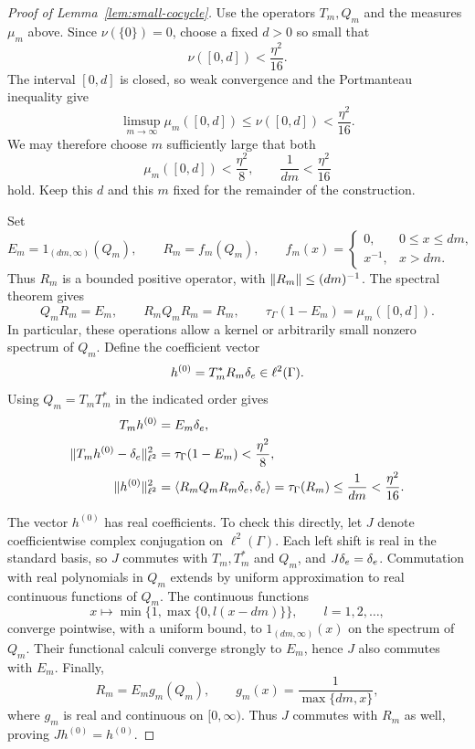 \begin{proof}[Proof of Lemma~\ref{lem:small-cocycle}]
Use the operators $T_m,Q_m$ and the measures $\mu_m$ above.
Since $\nu(\{0\})=0$, choose a fixed $d>0$ so small that
\[
  \nu([0,d])<\frac{\eta^2}{16}.
\]
The interval $[0,d]$ is closed, so weak convergence and the
Portmanteau inequality give
\[
  \limsup_{m\to\infty}\mu_m([0,d])
     \leq\nu([0,d])<\frac{\eta^2}{16}.
\]
We may therefore choose $m$ sufficiently large that both
\begin{equation}
\label{eq:cocycle-cutoff-choices}
  \mu_m([0,d])<\frac{\eta^2}{8},
  \qquad
  \frac{1}{dm}<\frac{\eta^2}{16}
\end{equation}
hold.  Keep this $d$ and this $m$ fixed for the remainder of the
construction.

Set
\[
  E_m=1_{(dm,\infty)}(Q_m),
  \qquad R_m=f_m(Q_m),
  \qquad
  f_m(x)=
  \begin{cases}
    0,&0\leq x\leq dm,\\
    x^{-1},&x>dm.
  \end{cases}
\]
Thus $R_m$ is a bounded positive operator, with
$\left\lVert R_m\right\rVert\leq (dm)^{-1}$.
The spectral theorem gives
\begin{equation}
\label{eq:cocycle-cutoff-identities}
  Q_m R_m=E_m,
  \qquad R_m Q_m R_m=R_m,
  \qquad
  \tau_\Gamma(1-E_m)=\mu_m([0,d]).
\end{equation}
In particular, these operations allow a kernel or arbitrarily
small nonzero spectrum of $Q_m$.
Define the coefficient vector
\[
  h^{(0)}=T_m^*R_m\delta_e\in\ell^2(\Gamma).
\]
Using $Q_m=T_mT_m^*$ in the indicated order gives
\begin{align}
\label{eq:cocycle-cutoff-target}
  T_mh^{(0)}&=E_m\delta_e,\\
\label{eq:cocycle-cutoff-error}
  \|T_mh^{(0)}-\delta_e\|_{\ell^2}^2
    &=\tau_\Gamma(1-E_m)<\frac{\eta^2}{8},\\
\label{eq:cocycle-cutoff-size}
  \|h^{(0)}\|_{\ell^2}^2
    &=\langle R_mQ_mR_m\delta_e,\delta_e\rangle
      =\tau_\Gamma(R_m)
      \leq\frac{1}{dm}<\frac{\eta^2}{16}.
\end{align}

The vector $h^{(0)}$ has real coefficients.
To check this directly, let $J$ denote coefficientwise complex
conjugation on $\ell^2(\Gamma)$.
Each left shift is real in the standard basis, so $J$ commutes
with $T_m,T_m^*$ and $Q_m$, and $J\delta_e=\delta_e$.
Commutation with real polynomials in $Q_m$ extends by uniform
approximation to real continuous functions of $Q_m$.
The continuous functions
\[
  x\longmapsto \min\{1,\max\{0,l(x-dm)\}\},
  \qquad l=1,2,\ldots,
\]
converge pointwise, with a uniform bound, to
$1_{(dm,\infty)}(x)$ on the spectrum of $Q_m$.
Their functional calculi converge strongly to $E_m$, hence
$J$ also commutes with $E_m$.
Finally,
\[
  R_m=E_m g_m(Q_m),
  \qquad g_m(x)=\frac{1}{\max\{dm,x\}},
\]
where $g_m$ is real and continuous on $[0,\infty)$.
Thus $J$ commutes with $R_m$ as well, proving
$Jh^{(0)}=h^{(0)}$.


\end{proof}
